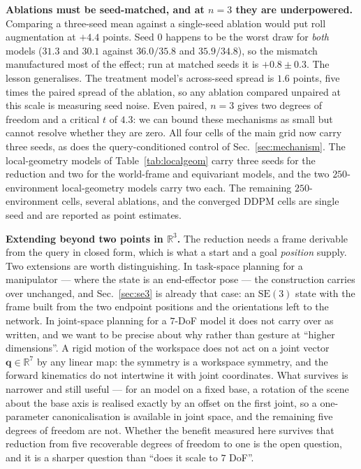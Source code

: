 \documentclass[10pt,twocolumn,letterpaper]{article}
\theoremstyle{plain}
\newcommand{\SE}{\mathrm{SE}(3)}
\begin{document}
\textbf{Ablations must be seed-matched, and at $n{=}3$ they are underpowered.}
Comparing a three-seed mean against a single-seed ablation would put roll
augmentation at $+4.4$ points. Seed $0$ happens to be the worst draw for
\emph{both} models ($31.3$ and $30.1$ against $36.0/35.8$ and $35.9/34.8$), so the
mismatch manufactured most of the effect; run at matched seeds it is
$+0.8\pm0.3$. The lesson generalises. The treatment model's across-seed spread is
$1.6$ points, five times the paired spread of the ablation, so any ablation
compared unpaired at this scale is measuring seed noise. Even paired, $n{=}3$
gives two degrees of freedom and a critical $t$ of $4.3$: we can bound these
mechanisms as small but cannot resolve whether they are zero. All four cells of
the main grid now carry three seeds, as does the query-conditioned control of
Sec.~\ref{sec:mechanism}. The local-geometry models of
Table~\ref{tab:localgeom} carry three seeds for the reduction and two for the
world-frame and equivariant models, and the two $250$-environment
local-geometry models carry two each. The remaining $250$-environment cells,
several ablations, and the converged DDPM cells are single seed and are reported
as point estimates.

\textbf{Extending beyond two points in $\mathbb{R}^3$.} The reduction needs a
frame derivable from the query in closed form, which is what a start and a goal
\emph{position} supply. Two extensions are worth distinguishing. In task-space
planning for a manipulator --- where the state is an end-effector pose --- the
construction carries over unchanged, and Sec.~\ref{sec:se3} is already that case:
an $\SE$ state with the frame built from the two endpoint positions and the
orientations left to the network. In joint-space planning for a $7$-DoF model it
does not carry over as written, and we want to be precise about why rather than
gesture at ``higher dimensions''. A rigid motion of the workspace does not act on
a joint vector $\mathbf{q}\in\mathbb{R}^7$ by any linear map: the symmetry is a
workspace symmetry, and the forward kinematics do not intertwine it with joint
coordinates. What survives is narrower and still useful --- for an model on a fixed
base, a rotation of the scene about the base axis is realised exactly by an
offset on the first joint, so a one-parameter canonicalisation is available in
joint space, and the remaining five degrees of freedom are not. Whether the
benefit measured here survives that reduction from five recoverable degrees of
freedom to one is the open question, and it is a sharper question than ``does it
scale to $7$ DoF''.
\end{document}

